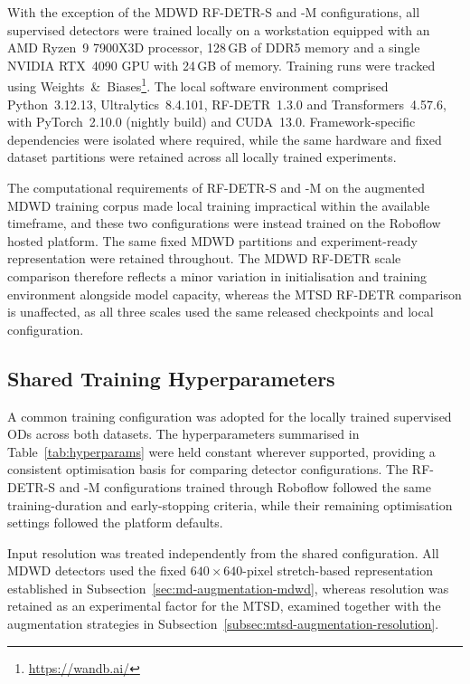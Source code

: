 \newpage
\noindent With the exception of the \gls{MDWD} \gls{RF-DETR}-S and -M configurations, all supervised detectors were trained locally on a workstation equipped with an AMD Ryzen~9 7900X3D processor, 128\,GB of \gls{DDR5} memory and a single NVIDIA RTX~4090 \gls{GPU} with 24\,GB of memory. Training runs were tracked using Weights~\&~Biases\footnote{\url{https://wandb.ai/}}. The local software environment comprised Python~3.12.13, Ultralytics~8.4.101, \gls{RF-DETR}~1.3.0 and Transformers~4.57.6, with PyTorch~2.10.0 (nightly build) and \gls{CUDA}~13.0. Framework-specific dependencies were isolated where required, while the same hardware and fixed dataset partitions were retained across all locally trained experiments.

The computational requirements of \gls{RF-DETR}-S and -M on the augmented \gls{MDWD} training corpus made local training impractical within the available timeframe, and these two configurations were instead trained on the Roboflow hosted platform. The same fixed \gls{MDWD} partitions and experiment-ready representation were retained throughout. The \gls{MDWD} \gls{RF-DETR} scale comparison therefore reflects a minor variation in initialisation and training environment alongside model capacity, whereas the \gls{MTSD} \gls{RF-DETR} comparison is unaffected, as all three scales used the same released checkpoints and local configuration.

\subsection{Shared Training Hyperparameters}
\label{sec:supervised-hyperparams}
A common training configuration was adopted for the locally trained supervised \glspl{OD} across both datasets. The hyperparameters summarised in Table~\ref{tab:hyperparams} were held constant wherever supported, providing a consistent optimisation basis for comparing detector configurations. The \gls{RF-DETR}-S and -M configurations trained through Roboflow followed the same training-duration and early-stopping criteria, while their remaining optimisation settings followed the platform defaults.

Input resolution was treated independently from the shared configuration. All \gls{MDWD} detectors used the fixed \(640 \times 640\)-pixel stretch-based representation established in Subsection~\ref{sec:md-augmentation-mdwd}, whereas resolution was retained as an experimental factor for the \gls{MTSD}, examined together with the augmentation strategies in Subsection~\ref{subsec:mtsd-augmentation-resolution}.

